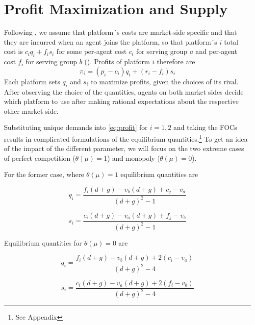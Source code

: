 \documentclass[10pt,a4paper]{scrreprt}
\begin{document}
\section{Profit Maximization and Supply}
Following \cite{armstrong_competition_2006}, we assume that platform´s costs are market-side specific and that they are incurred when an agent joins the platform, so that platform´s $i$ total cost is $c_i q_i+f_i s_i$ for some per-agent cost $c_i$ for serving group $a$ and per-agent cost $f_i$ for serving group $b$ (\cite{armstrong_competition_2006}). Profits of platform $i$ therefore are 
\begin{equation}\label{eq:profit}
\pi_i=(p_i-c_i)q_i+(r_i-f_i)s_i
\end{equation}
Each platform sets $q_i$ and $s_i$ to maximize profits, given the choices of its rival. After observing the choice of the quantities, agents on both market sides decide which platform to use after making rational expectations about the respective other market side.  

Substituting unique demands into \ref{eq:profit} for $i=1,2$ and taking the FOCs results in complicated formulations of the equilibrium quantities.\footnote{See Appendix} To get an idea of the impact of the different parameter, we will focus on the two extreme cases of perfect competition ($\theta (\mu) = 1$) and monopoly ($\theta (\mu) = 0$). 

For the former case, where $\theta (\mu) = 1$ equilibrium quantities are

\begin{equation}\label{perfect competition quantities1}
	q_i=\frac{f_i(d+g)-v_b(d+g)+c_j-v_a}{(d+g)^2-1}
\end{equation}

\begin{equation}\label{perfect competition quantities2}
	s_i=\frac{c_i(d+g)-v_a(d+g)+f_j-v_b}{(d+g)^2-1}
\end{equation}


Equilibrium quantities for $\theta (\mu) = 0$ are

\begin{equation}\label{monopoly quantities1}
	q_i=\frac{f_i(d+g)-v_b(d+g)+2(c_i-v_a)}{(d+g)^2-4}
\end{equation}

\begin{equation}\label{monopoly quantities2}
	s_i=\frac{c_i(d+g)-v_a(d+g)+2(f_i-v_b)}{(d+g)^2-4}
\end{equation}
\end{document}
